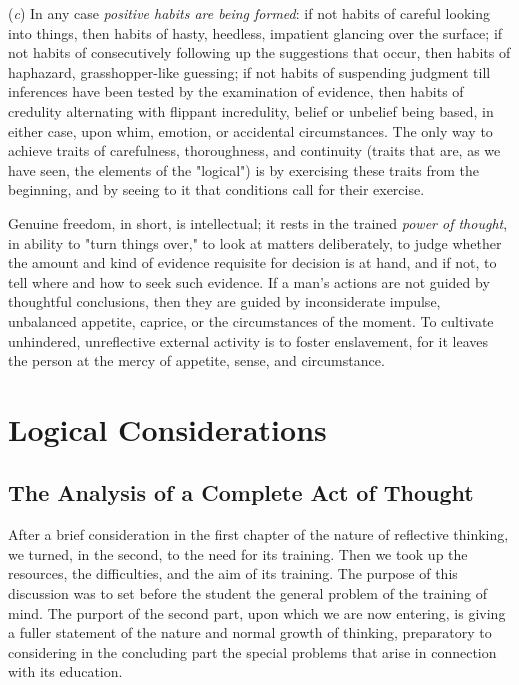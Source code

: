 \documentclass[letterpaper]{book}
\begin{document}

(\emph{c}) In any case \emph{positive habits are being formed}: if not
habits of careful looking into things, then habits of hasty, heedless,
impatient glancing over the surface; if not habits of consecutively
following up the suggestions that occur, then habits of haphazard,
grasshopper-like guessing; if not habits of suspending judgment till
inferences have been tested by the examination of evidence, then habits
of credulity alternating with flippant incredulity, belief or unbelief
being based, in either case, upon whim, emotion, or accidental
circumstances. The only way to achieve traits of carefulness,
thoroughness, and continuity (traits that are, as we have seen, the
elements of the "logical") is by exercising these traits from the
beginning, and by seeing to it that conditions call for their exercise.


Genuine freedom, in short, is intellectual; it rests in the trained
\emph{power of thought}, in ability to "turn things over," to look at
matters deliberately, to judge whether the amount and kind of evidence
requisite for
decision
is at hand, and if not, to tell where and how to seek such evidence. If
a man's actions are not guided by thoughtful conclusions, then they are
guided by inconsiderate impulse, unbalanced appetite, caprice, or the
circumstances of the moment. To cultivate unhindered, unreflective
external activity is to foster enslavement, for it leaves the person at
the mercy of appetite, sense, and
circumstance.

\part{Logical Considerations}

\chapter{The Analysis of a Complete Act of Thought}


After a brief consideration in the first chapter of the nature of
reflective thinking, we turned, in the second, to the need for its
training. Then we took up the resources, the difficulties, and the aim
of its training. The purpose of this discussion was to set before the
student the general problem of the training of mind. The purport of the
second part, upon which we are now entering, is giving a fuller
statement of the nature and normal growth of thinking, preparatory to
considering in the concluding part the special problems that arise in
connection with its education.
\end{document}
